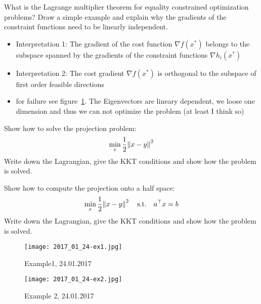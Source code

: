\documentclass{article}
\begin{document}
\begin{question}
  What is the Lagrange multiplier theorem for equality constrained optimization problems? Draw a
  simple example and explain why the gradients of the constraint functions need to be linearly
  independent.
\end{question}
\begin{itemize}
\item Interpretation 1: The gradient of the cost function $\nabla f (x^*)$
  belongs to the subspace spanned by the gradients of the
  constraint functions $\nabla h_i (x^* )$
\item Interpretation 2: The cost gradient $\nabla f (x^* )$ is orthogonal to
  the subspace of first order feasible directions
\item for failure see figure~\ref{fig:ex1}. The Eigenvectors are lineary dependent, we loose one
  dimension and thus we can not optimize the problem (at least I think so)
\end{itemize}

\begin{question}
  Show how to solve the projection problem:
  \[
    \min_x \frac{1}{2} \enVert{x - y}^2
  \]
  Write down the Lagrangian, give the KKT conditions and show how the
problem is solved.
\end{question}

\begin{question}
  Show how to compute the projection onto a half space:
  \[
    \min_x \frac{1}{2} \enVert{x-y}^2 \quad \text{s.t.} \quad \T{a}x = b
  \]
  Write down the Lagrangian, give the KKT conditions and show how the
  problem is solved.
\end{question}


\begin{figure}[H]
  \texttt{[image: 2017\_01\_24-ex1.jpg]}
  \caption{Example1,  24.01.2017\label{fig:ex1}}
\end{figure}

\begin{figure}[H]
  \texttt{[image: 2017\_01\_24-ex2.jpg]}
  \caption{Example 2,  24.01.2017\label{fig:ex2}}
\end{figure}
\end{document}
